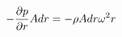 \documentclass[preview]{standalone}
\begin{document}
\begin{align*}
\special{dvisvgm:raw <g id='unique000'>}- \frac{\partial p}{\partial r} A dr = - \rho A dr \omega^2r\special{dvisvgm:raw </g>}
\end{align*}
\end{document}

